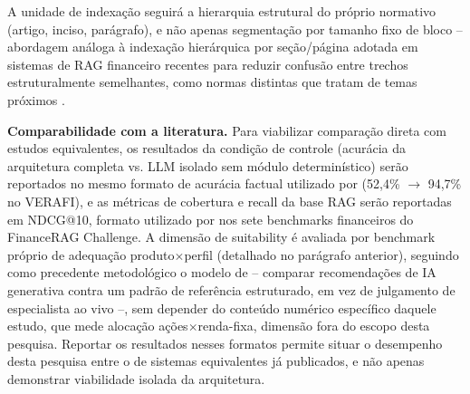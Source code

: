 A unidade de indexa\c{c}\~ao seguir\'a a hierarquia estrutural do
pr\'oprio normativo (artigo, inciso, par\'agrafo), e n\~ao apenas
segmenta\c{c}\~ao por tamanho fixo de bloco -- abordagem an\'aloga \`a
indexa\c{c}\~ao hier\'arquica por se\c{c}\~ao/p\'agina adotada em
sistemas de RAG financeiro recentes para reduzir confus\~ao entre
trechos estruturalmente semelhantes, como normas distintas que tratam
de temas pr\'oximos \autocite{li2025fingear,choe2025hirec,kobeissi2026}.


\textbf{Comparabilidade com a literatura.} Para viabilizar compara\c{c}\~ao
direta com estudos equivalentes, os resultados da condi\c{c}\~ao de
controle (acur\'acia da arquitetura completa vs. LLM isolado sem m\'odulo
determin\'istico) ser\~ao reportados no mesmo formato de acur\'acia
factual utilizado por \textcite{akinfaderin2025} (52,4\%
$\rightarrow$ 94,7\% no VERAFI), e as m\'etricas de cobertura e recall da
base RAG ser\~ao reportadas em NDCG@10, formato utilizado por
\textcite{kim2025} nos sete benchmarks financeiros do FinanceRAG
Challenge. A dimens\~ao de suitability \'e avaliada por benchmark
pr\'oprio de adequa\c{c}\~ao produto$\times$perfil (detalhado no par\'agrafo
anterior), seguindo como precedente metodol\'ogico o modelo de
\textcite{oehler2024} -- comparar recomenda\c{c}\~oes de IA generativa
contra um padr\~ao de refer\^encia estruturado, em vez de julgamento de
especialista ao vivo --, sem depender do conte\'udo num\'erico espec\'ifico
daquele estudo, que mede aloca\c{c}\~ao a\c{c}\~oes$\times$renda-fixa,
dimens\~ao fora do escopo desta pesquisa. Reportar os resultados nesses
formatos permite situar o desempenho desta pesquisa entre o de sistemas
equivalentes j\'a publicados, e n\~ao apenas demonstrar viabilidade
isolada da arquitetura.

